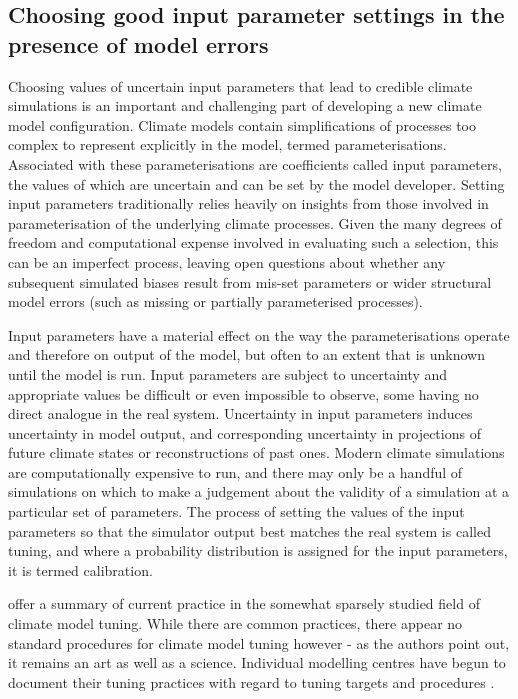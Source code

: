 \documentclass[gmd, manuscript]{copernicus}
\begin{document}


\introduction  %
\subsection{Choosing good input parameter settings in the presence of model errors}

%

Choosing values of uncertain input parameters that lead to credible climate simulations is an important and challenging part of developing a new climate model configuration. Climate models contain simplifications of processes too complex to represent explicitly in the model, termed parameterisations. Associated with these parameterisations are coefficients called input parameters, the values of which are uncertain and can be set by the model developer. Setting input parameters traditionally relies heavily on insights from those involved in parameterisation of the underlying climate processes. Given the many degrees of freedom and computational expense involved in evaluating such a selection, this can be an imperfect process, leaving open questions about whether any subsequent simulated biases result from mis-set parameters or wider structural model errors (such as missing or partially parameterised processes). 

Input parameters have a material effect on the way the parameterisations operate and therefore on output of the model, but often to an extent that is unknown until the model is run. Input parameters are subject to uncertainty and appropriate values be difficult or even impossible to observe, some having no direct analogue in the real system. Uncertainty in input parameters induces uncertainty in model output, and corresponding uncertainty in projections of future climate states or reconstructions of past ones. Modern climate simulations are computationally expensive to run, and there may only be a handful of simulations on which to make a judgement about the validity of a simulation at a particular set of parameters. The process of setting the values of the input parameters so that the simulator output best matches the real system is called tuning, and where a probability distribution is assigned for the input parameters, it is termed calibration. 

\cite{hourdin2017art} offer a summary of current practice in the somewhat sparsely studied field of climate model tuning. While there are common practices, there appear no standard procedures for climate model tuning however - as the authors point out, it remains an art as well as a science. Individual modelling centres have begun to document their tuning practices with regard to tuning targets and procedures \citep{schmidt2017practice, zhao2018gfdl, walters2017um7}. 
\end{document}
